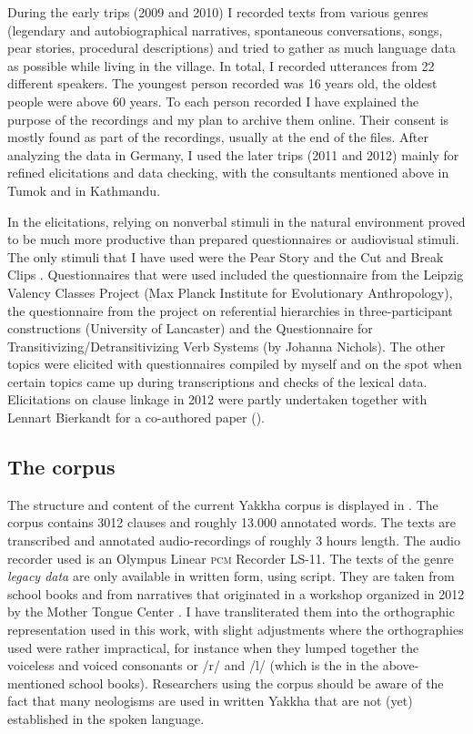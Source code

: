  
During the early trips (2009 and 2010) I recorded texts from various genres (legendary and autobiographical narratives, spontaneous conversations, songs, pear stories, procedural descriptions) and tried to gather as much language data as possible while living in the village. In total, I recorded utterances from 22 different speakers. The youngest person recorded was 16 years old, the oldest people were above 60 years. To each person recorded I have explained the purpose of the recordings and my plan to archive them online. Their consent is mostly found as part of the recordings, usually at the end of the files.  After analyzing the data in Germany, I used the later trips (2011 and 2012) mainly for refined elicitations and data checking, with the consultants mentioned above in Tumok and in Kathmandu. 

In the elicitations, relying on nonverbal stimuli in the natural environment proved to be much more productive than prepared questionnaires or audiovisual stimuli. The only stimuli that I have used were the Pear Story \citep{Chafe1980The-Pear} and the Cut and Break Clips \citep{Bohnemeyeretal2010_cut}. Questionnaires that were used included the questionnaire from the Leipzig Valency Classes Project (Max Planck Institute for Evolutionary Anthropology), the questionnaire from the project on referential hierarchies in three-participant constructions (University of Lancaster) and the Questionnaire for Transitivizing/Detran\-sitivizing Verb Systems (by Johanna Nichols). The other topics were elicited with questionnaires compiled by myself and on the spot when certain topics came up during transcriptions and checks of the lexical data. Elicitations on clause linkage in 2012 were partly undertaken together with Lennart Bierkandt for a co-authored paper (\citealt{Bierkandtetal_Scope}).

\subsection{The corpus}\label{corpus}

The structure and content of the current Yakkha corpus is displayed in . The corpus contains 3012 clauses and roughly 13.000 annotated words. The texts are transcribed and annotated audio-recordings of roughly 3 hours length. The audio recorder used is an Olympus Linear \textsc{pcm} Recorder LS-11. The texts of the genre \emph{legacy data} are only available in written form, using  script. They are taken from school books \citep{Jimi2009Engka-Yakkha, Jimi2010Engka-Yakkha} and from narratives that originated in a workshop organized in 2012 by the Mother Tongue Center  \citep{Jimee2012_Casuwa, Jimee2012_Owl, Linkha2012_Ashes}. I have transliterated them into the orthographic representation used in this work, with slight adjustments where the orthographies used  were rather impractical, for instance when they lumped together the voiceless and voiced consonants or /r/ and /l/ (which is the  in the above-mentioned school books). Researchers using the corpus should be aware of the fact that many neologisms are used in written Yakkha that are not (yet) established in the spoken language. 

